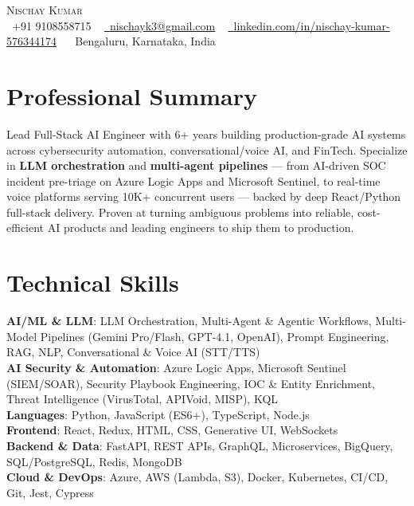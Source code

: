 \documentclass[letterpaper,8.5pt]{article}
\begin{document}
\begin{center}
    {\Huge \scshape Nischay Kumar} \\ \vspace{1pt}
    \small \raisebox{-0.1\height}\faPhone\ +91 9108558715 ~ \href{mailto:nischayk3@gmail.com}{\raisebox{-0.2\height}\faEnvelope\  \underline{nischayk3@gmail.com}} ~
    \href{https://linkedin.com/in/nischay-kumar-576344174}{\raisebox{-0.2\height}\faLinkedin\ \underline{linkedin.com/in/nischay-kumar-576344174}} ~
    \faMapMarker\ Bengaluru, Karnataka, India
    \vspace{-7pt}
\end{center}
\section{Professional Summary}
\small{Lead Full-Stack AI Engineer with 6+ years building production-grade AI systems across cybersecurity automation, conversational/voice AI, and FinTech. Specialize in \textbf{LLM orchestration} and \textbf{multi-agent pipelines} --- from AI-driven SOC incident pre-triage on Azure Logic Apps and Microsoft Sentinel, to real-time voice platforms serving 10K+ concurrent users --- backed by deep React/Python full-stack delivery. Proven at turning ambiguous problems into reliable, cost-efficient AI products and leading engineers to ship them to production.}
\section{Technical Skills}
 \begin{itemize}[leftmargin=0.10in, label={}]
    \small{\item{
     \textbf{AI/ML \& LLM}{: LLM Orchestration, Multi-Agent \& Agentic Workflows, Multi-Model Pipelines (Gemini Pro/Flash, GPT-4.1, OpenAI), Prompt Engineering, RAG, NLP, Conversational \& Voice AI (STT/TTS)} \\
     \textbf{AI Security \& Automation}{: Azure Logic Apps, Microsoft Sentinel (SIEM/SOAR), Security Playbook Engineering, IOC \& Entity Enrichment, Threat Intelligence (VirusTotal, APIVoid, MISP), KQL} \\
     \textbf{Languages}{: Python, JavaScript (ES6+), TypeScript, Node.js} \\
     \textbf{Frontend}{: React, Redux, HTML, CSS, Generative UI, WebSockets} \\
     \textbf{Backend \& Data}{: FastAPI, REST APIs, GraphQL, Microservices, BigQuery, SQL/PostgreSQL, Redis, MongoDB} \\
     \textbf{Cloud \& DevOps}{: Azure, AWS (Lambda, S3), Docker, Kubernetes, CI/CD, Git, Jest, Cypress}
    }}
 \end{itemize}
 \vspace{-12pt}
\end{document}

